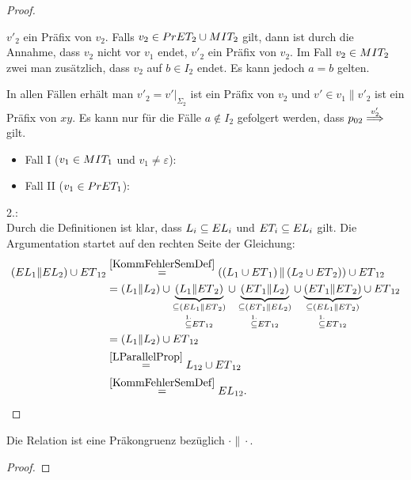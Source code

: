 \begin{proof}
\begin{itemize}
      $v'_2$ ein Präfix von $v_2$. Falls $v_2\in PrET _2\cup MIT _2$ gilt,
      dann ist durch die Annahme, dass $v_2$ nicht vor $v_1$ endet, $v'_2$ ein
      Präfix von $v_2$. Im Fall $v_2 \in MIT _2$ zwei man zusätzlich, dass
      $v_2$ auf $b\in I_2$ endet. Es kann jedoch $a=b$ gelten.
  \end{itemize}
  In allen Fällen erhält man $v'_2=v'|_{\Sigma _2}$ ist ein Präfix von $v_2$
  und $v'\in v_1\|v'_2$ ist ein Präfix von $xy$. Es kann nur für die Fälle
  $a\notin I_2$ gefolgert werden, dass $p_{02} \weakmust[v'_2]$ gilt.
  \begin{itemize}
    \item Fall I ($v_1\in MIT _1$ und $v_1\neq \varepsilon$): 
    \item Fall II ($v_1\in PrET _1$): 
  \end{itemize}

  2.:\\
  Durch die Definitionen ist klar, dass $L_i\subseteq EL _i$ und $ET
  _i\subseteq EL _i$ gilt. Die Argumentation startet auf den rechten Seite der
  Gleichung:
  \begin{align*}
    (EL{}_1\| EL{}_2)\cup
    ET{}_{12}&\overset{\ref{KommFehlerSemDef}}{=}\left(\left(L_1\cup
    ET{}_1\right)\|\left(L_2\cup ET{}_2\right)\right)\cup ET{}_{12}\\
    &=(L_1\|L_2) \cup \underset{\overset{1.}{\subseteq}
    ET{}_{12}}{\underset{\subseteq
    (EL{}_1\|ET{}_2)}{\underbrace{(L_1\|ET{}_2)}}} \cup
    \underset{\overset{1.}{\subseteq} ET{}_{12}}{\underset{\subseteq
    (ET{}_1\|EL{}_2)}{\underbrace{(ET{}_1\|L_2)}}} \cup
    \underset{\overset{1.}{\subseteq} ET{}_{12}}{\underset{\subseteq
    (EL{}_1\|ET{}_2)}{\underbrace{(ET{}_1\|ET{}_2)}}} \cup ET{}_{12}\\
    &=(L_1\|L_2) \cup ET{}_{12}\\
    &\overset{\ref{LParallelProp}}{=}L_{12}\cup ET{}_{12}\\
    &\overset{\ref{KommFehlerSemDef}}{=}EL{}_{12}.
  \end{align*}
\end{proof}

\begin{Kor}
  Die Relation \ERel{} ist eine Präkongruenz bezüglich $\cdot\|\cdot$.
\end{Kor}
\begin{proof}
\end{proof}


